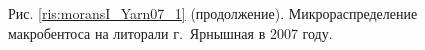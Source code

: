 \documentclass[12pt, a4paper]{disser}
\begin{document}
\begin{figure}[h]





%
%



	\begin{center}
	Рис. \ref{ris:moransI_Yarn07_1} (продолжение). Микрораспределение макробентоса на литорали г.~Ярнышная в 2007 году.
	\end{center}
  \end{figure}
\end{document}
